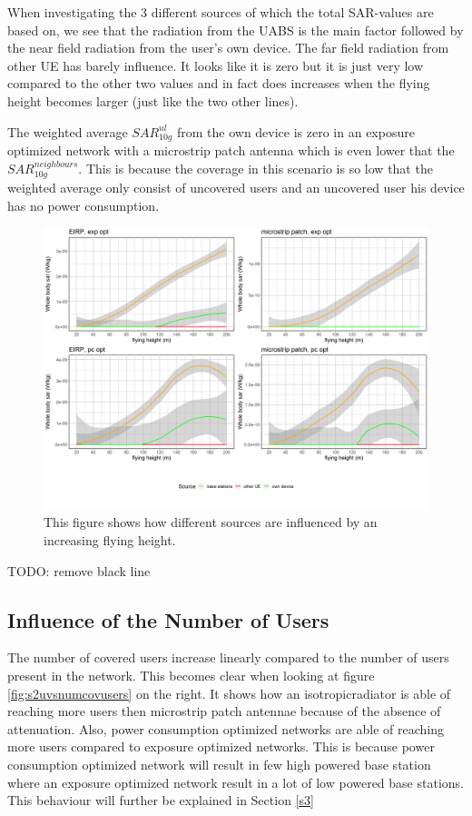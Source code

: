 When investigating the 3 different sources of which the total \gls{SAR}-values are based on, we see 
that the radiation from the \gls{UABS} is the main factor followed by the near field radiation from the user's own device.
The far field radiation from other \gls{UE} has barely influence. 
It looks like it is zero but it is just very low compared to the other two values and in fact does increases when the flying height becomes larger (just like the two other lines).

The weighted average $SAR^{ul}_{10g}$ from the own device is zero in an exposure optimized network with a microstrip patch antenna which is even lower that the $SAR^{neighbours}_{10g}$.
This is because the coverage in this scenario is so low that the weighted average only consist of uncovered users and an uncovered user his device has no power consumption.
\begin{figure}[h!]
  \includegraphics[width=\textwidth]{../results/s2/fhFourSources.png}
  \caption{This figure shows how different sources are influenced by an increasing flying height.}
  \label{fig:s2shfourSourcesMatrix}
\end{figure}

TODO: remove black line


\FloatBarrier
\subsection{Influence of the Number of Users}
\label{s2b}

The number of covered users increase linearly compared to the number of users present in the network. This becomes clear when looking at figure 
\ref{fig:s2uvsnumcovusers} on the right. It shows how an \gls{isotropicradiator} is able of reaching more users then microstrip patch antennae because of the absence of attenuation.
Also, power consumption optimized networks are able of reaching more users compared to exposure optimized networks.
This is because power consumption optimized network will result in few high powered base station where an 
exposure optimized network result in a lot of low powered base stations. This behaviour will further be explained in Section \ref{s3}


